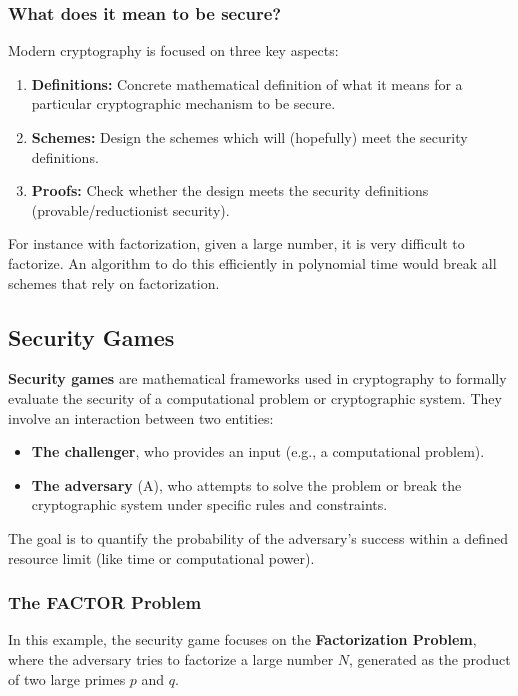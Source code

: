 \subsubsection{What does it mean to be secure?}
Modern cryptography is focused on three key aspects:
\begin{enumerate}
\item \textbf{Definitions:} Concrete mathematical definition of what it means for a particular cryptographic mechanism to be secure.
\item \textbf{Schemes:} Design the schemes which will (hopefully) meet the security definitions.
\item \textbf{Proofs:} Check whether the design meets the security definitions (provable/reductionist security).
\end{enumerate}

For instance with factorization, given a large number, it is very difficult to factorize. An algorithm to do this efficiently in polynomial time would break all schemes that rely on factorization. 

\subsection{Security Games}
\textbf{Security games} are mathematical frameworks used in cryptography to formally evaluate the security of a computational problem or cryptographic system. They involve an interaction between two entities:

\begin{itemize}
    \item \textbf{The challenger}, who provides an input (e.g., a computational problem).
    \item \textbf{The adversary} (A), who attempts to solve the problem or break the cryptographic system under specific rules and constraints.
\end{itemize}

The goal is to quantify the probability of the adversary's success within a defined resource limit (like time or computational power).

\subsubsection{The FACTOR Problem}
In this example, the security game focuses on the \textbf{Factorization Problem}, where the adversary tries to factorize a large number \(N\), generated as the product of two large primes \(p\) and \(q\). \\

